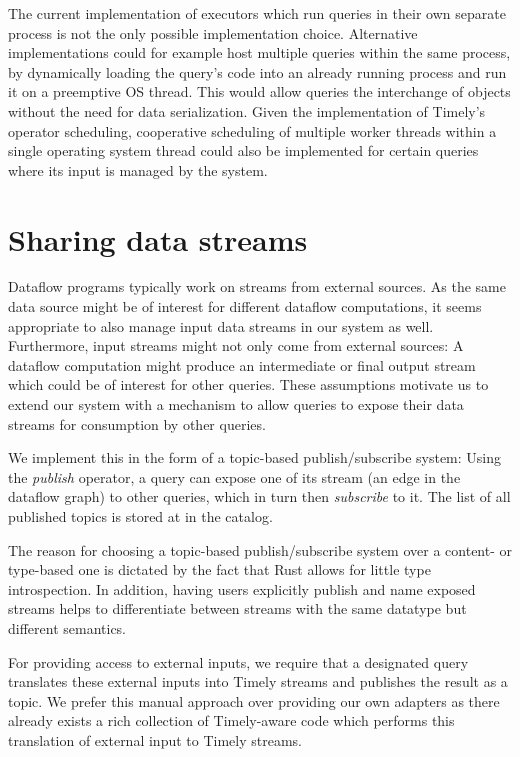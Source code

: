 The current implementation of executors which run queries in their own separate
process is not the only possible implementation choice.
Alternative implementations could for example host multiple queries
within the same process, by dynamically loading the query's code into an already
running process and run it on a preemptive OS thread. This would allow queries
the interchange of objects without the need for data serialization. Given
the implementation of Timely's operator scheduling, cooperative scheduling
of multiple worker threads within a single operating system thread could also
be implemented for certain queries where its input is managed by the system.


\section{Sharing data streams} \label{sec:sharingstreams}

Dataflow programs typically work on streams from external sources. As the same
data source might be of interest for different dataflow computations, it seems
appropriate to also manage input data streams in our system as well. Furthermore,
input streams might not only come from external sources: A dataflow computation
might produce an intermediate or final output stream which could be of interest
for other queries. These assumptions motivate us to extend our system with a
mechanism to allow queries to expose their data streams for consumption by other
queries.

We implement this in the form of a topic-based publish/subscribe system:
Using the \emph{publish} operator, a query can expose one of its stream
(an edge in the dataflow graph) to other queries, which in turn then \emph{subscribe}
to it. The list of all published topics is stored at in the catalog.

The reason for choosing a topic-based publish/subscribe system over a
content- or type-based one is dictated by the fact that Rust allows for little
type introspection. In addition, having users explicitly publish and name
exposed streams helps to differentiate between streams with the same datatype
but different semantics.

For providing access to external inputs, we require that a designated query
translates these external inputs into Timely streams and publishes the result as
a topic. We prefer this manual approach over providing our own adapters as there
already exists a rich collection of Timely-aware code which performs this
translation of external input to Timely streams.


